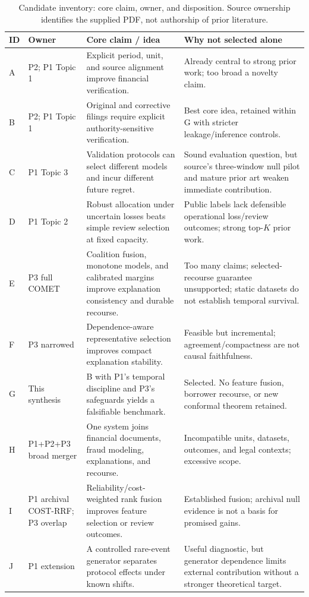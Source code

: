 \documentclass[11pt,a4paper]{article}
\begin{document}
\begin{table}[H]\caption{Candidate inventory: core claim, owner, and disposition. Source ownership identifies the supplied PDF, not authorship of prior literature.}
\footnotesize\begin{tabularx}{\linewidth}{p{.08\linewidth}p{.14\linewidth}YY}\toprule
ID & Owner & Core claim / idea & Why not selected alone\\\midrule
A & P2; P1 Topic 1 & Explicit period, unit, and source alignment improve financial verification. & Already central to strong prior work; too broad a novelty claim.\\
B & P2; P1 Topic 1 & Original and corrective filings require explicit authority-sensitive verification. & Best core idea, retained within G with stricter leakage/inference controls.\\
C & P1 Topic 3 & Validation protocols can select different models and incur different future regret. & Sound evaluation question, but source's three-window null pilot and mature prior art weaken immediate contribution.\\
D & P1 Topic 2 & Robust allocation under uncertain losses beats simple review selection at fixed capacity. & Public labels lack defensible operational loss/review outcomes; strong top-$K$ prior work.\\
E & P3 full COMET & Coalition fusion, monotone models, and calibrated margins improve explanation consistency and durable recourse. & Too many claims; selected-recourse guarantee unsupported; static datasets do not establish temporal survival.\\
F & P3 narrowed & Dependence-aware representative selection improves compact explanation stability. & Feasible but incremental; agreement/compactness are not causal faithfulness.\\
G & This synthesis & B with P1's temporal discipline and P3's safeguards yields a falsifiable benchmark. & Selected. No feature fusion, borrower recourse, or new conformal theorem retained.\\
H & P1+P2+P3 broad merger & One system joins financial documents, fraud modeling, explanations, and recourse. & Incompatible units, datasets, outcomes, and legal contexts; excessive scope.\\
I & P1 archival COST-RRF; P3 overlap & Reliability/cost-weighted rank fusion improves feature selection or review outcomes. & Established fusion; archival null evidence is not a basis for promised gains.\\
J & P1 extension & A controlled rare-event generator separates protocol effects under known shifts. & Useful diagnostic, but generator dependence limits external contribution without a stronger theoretical target.\\\bottomrule
\end{tabularx}\end{table}
\end{document}
